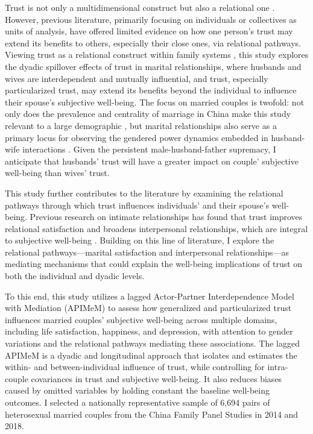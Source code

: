 Trust is not only a multidimensional construct but also a relational one \parencite{lewisTrustSocialReality1985}. However, previous literature, primarily focusing on individuals or collectives as units of analysis, have offered limited evidence on how one person's trust may extend its benefits to others, especially their close ones, via relational pathways. Viewing trust as a relational construct within family systems \parencite{bowenUseFamilyTheory1966}, this study explores the dyadic spillover effects of trust in marital relationships, where husbands and wives are interdependent and mutually influential, and trust, especially particularized trust, may extend its benefits beyond the individual to influence their spouse's subjective well-being. The focus on married couples is twofold: not only does the prevalence and centrality of marriage in China make this study relevant to a large demographic \parencite{jiangMarriageSqueezeNeverMarried2014,yanChineseFamiliesUpside2021}, but marital relationships also serve as a primary locus for observing the gendered power dynamics embedded in husband-wife interactions \parencite{barberLogicLimitsTrust1983,jiUnequalCareUnequal2017}. Given the persistent male-husband-father supremacy, I anticipate that husbands' trust will have a greater impact on couple' subjective well-being than wives' trust.

This study further contributes to the literature by examining the relational pathways through which trust influences individuals' and their spouse's well-being. Previous research on intimate relationships has found that trust improves relational satisfaction and broadens interpersonal relationships, which are integral to subjective well-being \parencite{adilRoleTrustMarital2013,fitzpatrickAttachmentTrustSatisfaction2017,luLongitudinalEvidenceSocial2019,shekMaritalQualityPsychological1995,wongExaminationRelationshipTrust2002}. Building on this line of literature, I explore the relational pathways—marital satisfaction and interpersonal relationships—as mediating mechanisms that could explain the well-being implications of trust on both the individual and dyadic levels.

To this end, this study utilizes a lagged Actor-Partner Interdependence Model with Mediation (APIMeM) to assess how generalized and particularized trust influences married couples' subjective well-being across multiple domains, including life satisfaction, happiness, and depression, with attention to gender variations and the relational pathways mediating these associations. The lagged APIMeM is a dyadic and longitudinal approach that isolates and estimates the within- and between-individual influence of trust, while controlling for intra-couple covariances in trust and subjective well-being. It also reduces biases caused by omitted variables by holding constant the baseline well-being outcomes. I selected a nationally representative sample of 6,694 pairs of heterosexual married couples from the China Family Panel Studies in 2014 and 2018.

